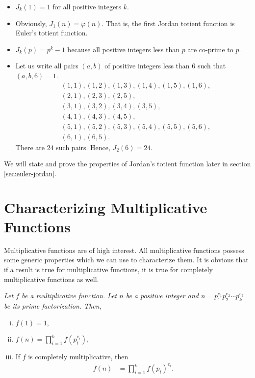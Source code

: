 \documentclass[12pt]{subfile}
\begin{document}
		\begin{example}
			$ $
			\begin{itemize}
				\item $J_k(1)=1$ for all positive integers $k$.
				\item Obviously, $J_1(n)=\varphi(n)$. That is, the first Jordan totient function is Euler's totient function.
				\item $J_k(p)=p^k - 1 $ because all positive integers less than $p$ are co-prime to $p$.
				\item Let us write all pairs $(a,b)$ of positive integers less than $6$ such that $(a,b,6)=1$.
					\begin{align*}
						&(1,1), (1,2), (1, 3), (1, 4), (1, 5), (1,6),\\
						&(2,1), (2,3), (2,5),\\
						&(3,1), (3,2), (3,4), (3,5),\\
						&(4,1), (4,3), (4,5),\\
						&(5,1), (5,2), (5,3), (5,4), (5,5), (5,6),\\
						&(6,1), (6,5).
					\end{align*}
				There are $24$ such pairs. Hence, $J_2(6)=24$.
			\end{itemize}
		\end{example}


We will state and prove the properties of Jordan's totient function later in section \ref{sec:euler-jordan}.

\section{Characterizing Multiplicative Functions} \label{sec:characterizing-multiplicative}
	Multiplicative functions are of high interest. All multiplicative functions possess some generic properties which we can use to characterize them. It is obvious that if a result is true for multiplicative functions, it is true for completely multiplicative functions as well.
		\begin{proposition}\slshape
			Let $f$ be a multiplicative function. Let $n$ be a positive integer and $n=p_1^{e_1}p_2^{e_2}\cdots p_k^{e_k}$ be its prime factorization. Then,
				\begin{enumerate}[i.]
					\item $f(1)=1$,
					\item $\displaystyle f(n) = \prod_{i=1}^{k}f(p_i^{e_i})$,
					\item If $f$ is completely multiplicative, then
						\begin{align*}
							f(n) & = \prod_{i=1}^{k}f(p_i)^{e_i}.
						\end{align*}
				\end{enumerate}
		\end{proposition}
\end{document}

